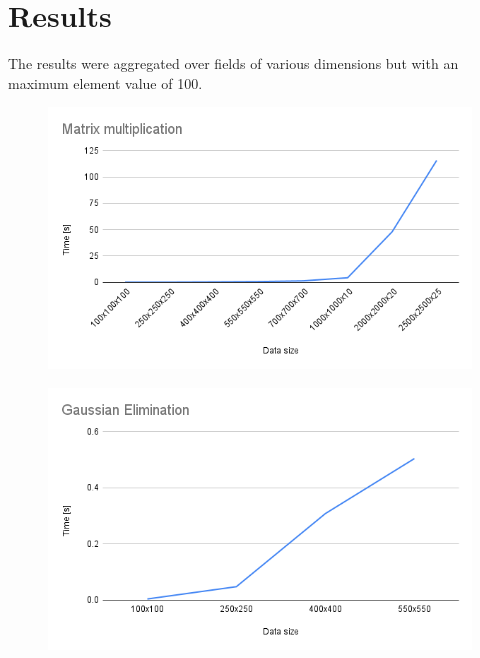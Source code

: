 \chapter{Results}

The results were aggregated over fields of various dimensions but with an maximum element value of 100.\\
\begin{minipage}{0.5\textwidth}
    \begin{figure}[H]
        \centering
        \includegraphics[width=1.0\textwidth]{content/Matrix_multiplication.png}
        \label{fig:Matrix_multiplication}
    \end{figure}
\end{minipage}
\begin{minipage}{0.5\textwidth}
    \begin{figure}[H]
        \centering
        \includegraphics[width=1.0\textwidth]{content/Gaussian_Elimination.png}
        \label{fig:Gaussian_Elimination}
    \end{figure}
\end{minipage}
